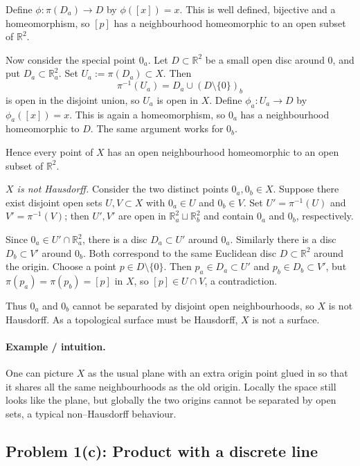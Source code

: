 \documentclass[12pt,a4paper]{article}
\theoremstyle{plain}
\theoremstyle{definition}      %
\begin{document}
Define $\phi:\pi(D_a)\to D$ by $\phi([x])=x$.  This is well defined,
bijective and a homeomorphism, so $[p]$ has a neighbourhood homeomorphic
to an open subset of $\mathbb{R}^2$.

Now consider the special point $0_a$.  Let $D\subset\mathbb{R}^2$ be a
small open disc around $0$, and put $D_a\subset\mathbb{R}^2_a$.
Set $U_a:=\pi(D_a)\subset X$.  Then
\[
\pi^{-1}(U_a) = D_a \cup (D\setminus\{0\})_b
\]
is open in the disjoint union, so $U_a$ is open in $X$.
Define $\phi_a:U_a\to D$ by $\phi_a([x])=x$.  This is again a
homeomorphism, so $0_a$ has a neighbourhood homeomorphic to $D$.
The same argument works for $0_b$.

Hence every point of $X$ has an open neighbourhood homeomorphic
to an open subset of $\mathbb{R}^2$.

\medskip\noindent
\emph{$X$ is not Hausdorff.}
Consider the two distinct points $0_a,0_b\in X$.
Suppose there exist disjoint open sets $U,V\subset X$ with
$0_a\in U$ and $0_b\in V$.
Set $U'=\pi^{-1}(U)$ and $V'=\pi^{-1}(V)$; then $U',V'$ are open in
$\mathbb{R}^2_a\sqcup\mathbb{R}^2_b$ and contain $0_a$ and $0_b$,
respectively.

Since $0_a\in U'\cap\mathbb{R}^2_a$, there is a disc $D_a\subset U'$
around $0_a$.  Similarly there is a disc $D_b\subset V'$ around $0_b$.
Both correspond to the same Euclidean disc $D\subset\mathbb{R}^2$
around the origin.  Choose a point $p\in D\setminus\{0\}$.
Then $p_a\in D_a\subset U'$ and $p_b\in D_b\subset V'$, but
$\pi(p_a)=\pi(p_b)=[p]$ in $X$, so $[p]\in U\cap V$, a contradiction.

Thus $0_a$ and $0_b$ cannot be separated by disjoint open neighbourhoods,
so $X$ is not Hausdorff.  As a topological surface must be Hausdorff,
$X$ is not a surface.

\paragraph{Example / intuition.}
One can picture $X$ as the usual plane with an extra origin point glued
in so that it shares all the same neighbourhoods as the old origin.
Locally the space still looks like the plane, but globally the two
origins cannot be separated by open sets, a typical non--Hausdorff
behaviour.

\bigskip

\subsection*{Problem 1(c): Product with a discrete line}
\end{document}
